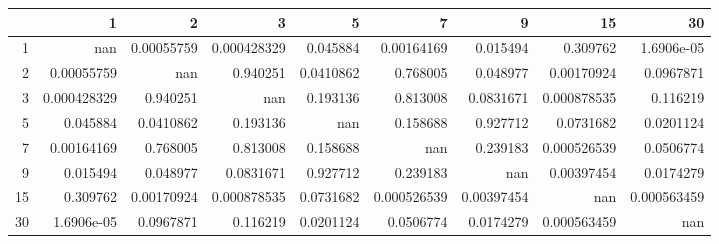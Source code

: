 \begin{tabular}{rrrrrrrrr}
\toprule
    &             1 &            2 &             3 &           5 &             7 &            9 &            15 &            30 \\
\midrule
  1 & nan           &   0.00055759 &   0.000428329 &   0.045884  &   0.00164169  &   0.015494   &   0.309762    &   1.6906e-05  \\
  2 &   0.00055759  & nan          &   0.940251    &   0.0410862 &   0.768005    &   0.048977   &   0.00170924  &   0.0967871   \\
  3 &   0.000428329 &   0.940251   & nan           &   0.193136  &   0.813008    &   0.0831671  &   0.000878535 &   0.116219    \\
  5 &   0.045884    &   0.0410862  &   0.193136    & nan         &   0.158688    &   0.927712   &   0.0731682   &   0.0201124   \\
  7 &   0.00164169  &   0.768005   &   0.813008    &   0.158688  & nan           &   0.239183   &   0.000526539 &   0.0506774   \\
  9 &   0.015494    &   0.048977   &   0.0831671   &   0.927712  &   0.239183    & nan          &   0.00397454  &   0.0174279   \\
 15 &   0.309762    &   0.00170924 &   0.000878535 &   0.0731682 &   0.000526539 &   0.00397454 & nan           &   0.000563459 \\
 30 &   1.6906e-05  &   0.0967871  &   0.116219    &   0.0201124 &   0.0506774   &   0.0174279  &   0.000563459 & nan           \\
\bottomrule
\end{tabular}